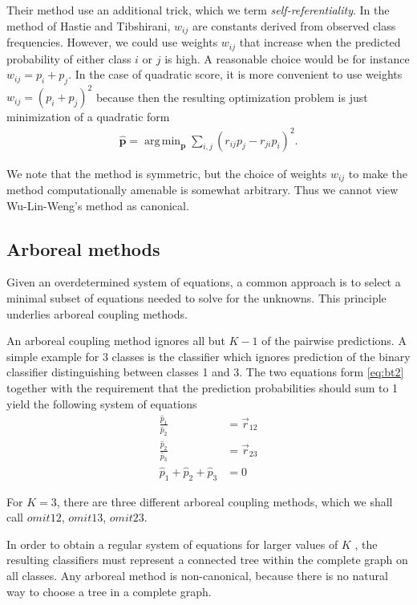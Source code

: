 \documentclass[twoside,11pt]{article}
\DeclareMathOperator*{\argmin}{arg\,min}
\begin{document}
Their method use an additional trick, which we term \emph{self-referentiality}. In the method of Hastie and Tibshirani, $w_{ij}$ are constants derived from observed class frequencies. However, we could use weights $w_{ij}$ that increase when the predicted probability of either class $i$ or $j$ is high. A reasonable choice would be for instance $w_{ij}= p_i + p_j$. In the case of quadratic score, it is more convenient to use weights $w_{ij} = (p_i + p_j)^2$ because then the resulting optimization problem is just minimization of a quadratic form
\begin{align*}
\hat{\boldsymbol{p}} = \argmin_{\boldsymbol{p}} \sum_{i,j} (r_{ij}p_j - r_{ji}p_i)^2.
\end{align*}

We note that the method is symmetric, but the choice of weights $w_{ij}$ to make the method computationally amenable is somewhat arbitrary. Thus we cannot view Wu-Lin-Weng's method as canonical.

\subsection{Arboreal methods}


Given an overdetermined system of equations, a common approach is to select a minimal subset of equations needed to solve for the unknowns. This principle underlies arboreal coupling methods.

An arboreal coupling method ignores all but $K-1$ of the pairwise predictions. A simple example for 3 classes is the classifier which ignores prediction of the binary classifier distinguishing between classes 1 and 3. The two equations form \eqref{eq:bt2} together with the requirement that the prediction probabilities should sum to 1 yield the following system of equations
\begin{equation}
	\begin{split}
		\frac{\hat p_1}{\hat p_2} &= \vec{r}_{12}\\
		\frac{\hat p_2}{\hat p_3} &= \vec{r}_{23}\\
		\hat p_1 + \hat p_2 + \hat p_3 &= 0
	\end{split}
\end{equation}

For $K=3$, there are three different arboreal coupling methods, which we shall call $omit12$, $omit13$, $omit23$. 

In order to obtain a regular system of equations for  larger values of $K$ , the resulting classifiers must represent a connected tree within the complete graph on all classes. Any arboreal method is non-canonical, because there is no natural way to choose a tree in a complete graph.
\end{document}
